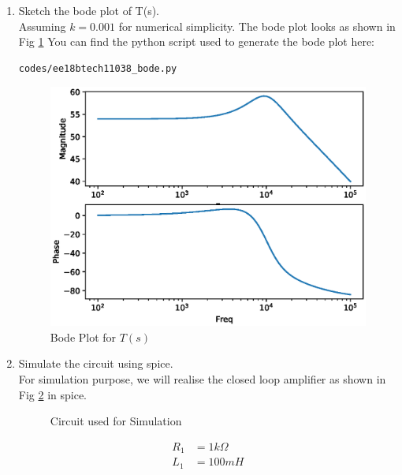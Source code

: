 \begin{enumerate}[label=\arabic*.,ref=\theenumi]
\item Sketch the bode plot of T(s).\\
\solution Assuming $k=0.001$ for numerical simplicity.
The bode plot looks as shown in Fig \ref{fig:ee18btech11038_bode}
You can find the python script used to generate the bode plot here:
\begin{lstlisting}
codes/ee18btech11038_bode.py
\end{lstlisting}
\begin{figure}[!ht]
\centering
\includegraphics[width=\columnwidth]{./figs/ee18btech11038_bode.eps}
\caption{Bode Plot for $T(s)$}
\label{fig:ee18btech11038_bode}
\end{figure}

\item Simulate the circuit using spice.\\
\solution For simulation purpose, we will realise the closed loop amplifier as shown in Fig \ref{fig:ee18btech11038_sim} in spice.


\begin{figure}[!ht]
	\begin{center}
		
		\resizebox{\columnwidth}{!}{}
	\end{center}
\caption{Circuit used for Simulation}
\label{fig:ee18btech11038_sim}
\end{figure}

\begin{align}
    R_{1}&= 1k\Omega \\
    L_{1}&= 100mH
\end{align}


\end{enumerate}
